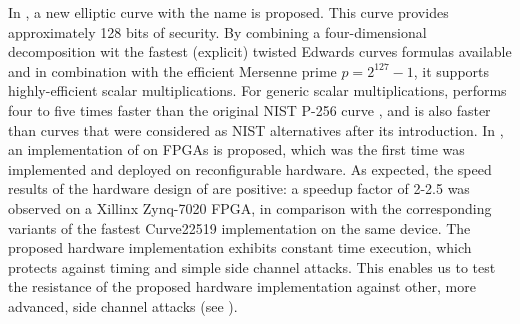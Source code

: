 In \cite{costello2015fourq}, a new elliptic curve with the name {\fourq} is proposed. 
This curve provides approximately 128 bits of security.
By combining a four-dimensional decomposition wit the fastest (explicit) twisted Edwards curves formulas available and in combination with the efficient Mersenne prime $p = 2^{127} - 1$, it supports highly-efficient scalar multiplications.
For generic scalar multiplications, {\fourq} performs four to five times faster than the original NIST P-256 curve \cite{costello2015fourq, gueron2015fast}, and is also faster than curves that were considered as NIST alternatives after its introduction.
In \cite{jarvinen2016four}, an implementation of {\fourq} on FPGAs is proposed, which was the first time {\fourq} was implemented and deployed on reconfigurable hardware.
As expected, the speed results of the hardware design of {\fourq} are positive: a speedup factor of 2-2.5 was observed on a Xillinx Zynq-7020 FPGA, in comparison with the corresponding variants of the fastest Curve22519 implementation on the same device.
The proposed {\fourq} hardware implementation exhibits constant time execution, which protects against timing and simple side channel attacks.
This enables us to test the resistance of the proposed hardware implementation against other, more advanced, side channel attacks (see ).

